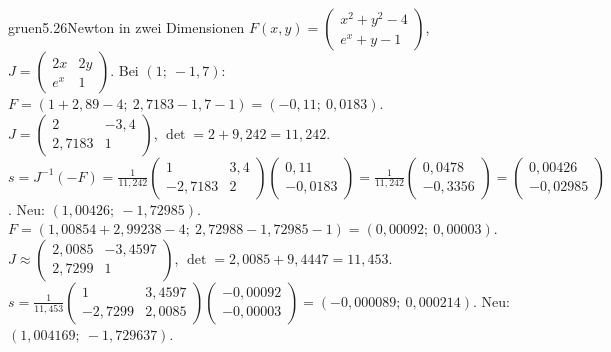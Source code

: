 \begin{loesungkarte}{gruen}{5.26}{Newton in zwei Dimensionen}
$F(x, y) = \begin{pmatrix}x^{2} + y^{2} - 4\\ e^{x} + y - 1\end{pmatrix}$, $J = \begin{pmatrix}2x & 2y\\ e^{x} & 1\end{pmatrix}$.
Bei $(1;\ -1{,}7)$: $F = (1 + 2{,}89 - 4;\ 2{,}7183 - 1{,}7 - 1) = (-0{,}11;\ 0{,}0183)$. $J = \begin{pmatrix}2 & -3{,}4\\ 2{,}7183 & 1\end{pmatrix}$, $\det = 2 + 9{,}242 = 11{,}242$. $s = J^{-1}(-F) = \frac1{11{,}242}\begin{pmatrix}1 & 3{,}4\\ -2{,}7183 & 2\end{pmatrix}\begin{pmatrix}0{,}11\\ -0{,}0183\end{pmatrix} = \frac1{11{,}242}\begin{pmatrix}0{,}0478\\ -0{,}3356\end{pmatrix} = \begin{pmatrix}0{,}00426\\ -0{,}02985\end{pmatrix}$. Neu: $(1{,}00426;\ -1{,}72985)$.
$F = (1{,}00854 + 2{,}99238 - 4;\ 2{,}72988 - 1{,}72985 - 1) = (0{,}00092;\ 0{,}00003)$. $J\approx\begin{pmatrix}2{,}0085 & -3{,}4597\\ 2{,}7299 & 1\end{pmatrix}$, $\det = 2{,}0085 + 9{,}4447 = 11{,}453$. $s = \frac1{11{,}453}\begin{pmatrix}1 & 3{,}4597\\ -2{,}7299 & 2{,}0085\end{pmatrix}\begin{pmatrix}-0{,}00092\\ -0{,}00003\end{pmatrix} = (-0{,}000089;\ 0{,}000214)$. Neu: $(1{,}004169;\ -1{,}729637)$.

\end{loesungkarte}
